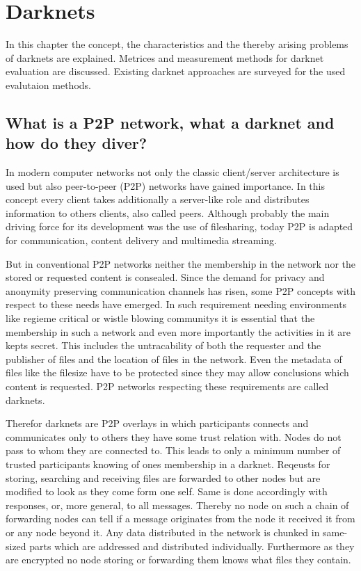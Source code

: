\chapter{Darknets}

In this chapter the concept, the characteristics and the thereby arising problems of darknets are explained. Metrices and measurement methods for darknet evaluation are discussed. Existing darknet approaches are surveyed for the used evalutaion methods. 

\section{What is a P2P network, what a darknet and how do they diver?}

In modern computer networks not only the classic client/server architecture is used but also peer-to-peer (P2P) networks have gained importance. In this concept every client takes additionally a server-like role and distributes information to others clients, also called peers. Although probably the main driving force for its development was the use of filesharing, today P2P is adapted for communication, content delivery and multimedia streaming.

But in conventional P2P networks neither the membership in the network nor the stored or requested content is consealed. Since the demand for privacy and anonymity preserving communication channels has risen, some P2P concepts with respect to these needs have emerged. In such requirement needing environments like regieme critical or wistle blowing communitys it is essential that the membership in such a network and even more importantly the activities in it are kepts secret. This includes the untracability of both the requester and the publisher of files and the location of files in the network. Even the metadata of files like the filesize have to be protected since they may allow conclusions which content is requested. P2P networks respecting these requirements are called darknets.

Therefor darknets are P2P overlays in which participants connects and communicates only to others they have some trust relation with. Nodes do not pass to whom they are connected to. This leads to only a minimum number of trusted participants knowing of ones membership in a darknet. Reqeusts for storing, searching and receiving files are forwarded to other nodes but are modified to look as they come form one self. Same is done accordingly with responses, or, more general, to all messages. Thereby no node on such a chain of forwarding nodes can tell if a message originates from the node it received it from or any node beyond it. Any data distributed in the network is chunked in same-sized parts which are addressed and distributed individually. Furthermore as they are encrypted no node storing or forwarding them knows what files they contain.


